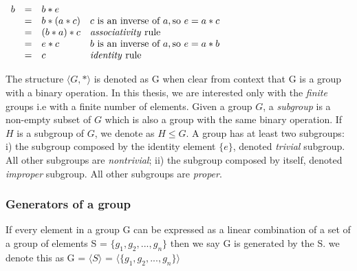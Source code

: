  $\begin{array}{lcll}     
b & = & b * e & \\
& = & b * (a * c) & c \text{ is an inverse of } a, \text{so } e = a * c\\
& = & (b * a) * c &   \text{\emph{associativity} rule}\\
& = & e * c       & b \text{ is an inverse of } a, \text{so } e = a * b\\
& = & c           &   \text{\emph{identity} rule}
\end{array}$

The structure $\langle G, * \rangle$ is denoted as G when clear from context that G is a group
with a binary operation. In this thesis, we are interested only with the \emph{finite} groups i.e
with a finite number of elements.
Given a group $G$, a \emph{subgroup} is a non-empty subset of $G$ which is also a group with 
the same binary operation. If $H$ is a subgroup of $G$, we denote as $H \leq G$.
A group has at least two subgroups: i) the subgroup composed by the identity element $\{e\}$, denoted \emph{trivial} subgroup.
All other subgroups are \emph{nontrivial}; ii) the subgroup composed by itself,
denoted \emph{improper} subgroup. All other subgroups are \emph{proper}.

\subsubsection{Generators of a group}
If every element in a group G can be expressed as a linear combination
of a set of a group of elements S = $\{g_1, g_2, ..., g_n \}$ then we say G is 
generated by the S. we denote this as G = $\langle S \rangle$ =
$\langle \{g_1, g_2, ..., g_n \} \rangle$ 

